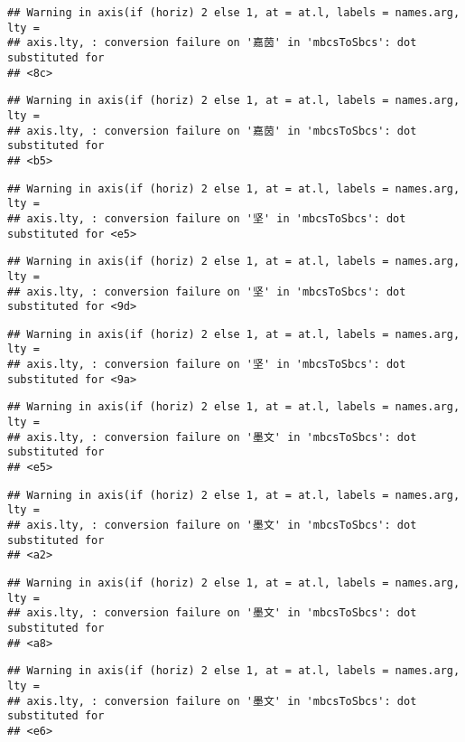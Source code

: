 \documentclass[
]{article}
\begin{document}
\begin{verbatim}
## Warning in axis(if (horiz) 2 else 1, at = at.l, labels = names.arg, lty =
## axis.lty, : conversion failure on '嘉茵' in 'mbcsToSbcs': dot substituted for
## <8c>
\end{verbatim}

\begin{verbatim}
## Warning in axis(if (horiz) 2 else 1, at = at.l, labels = names.arg, lty =
## axis.lty, : conversion failure on '嘉茵' in 'mbcsToSbcs': dot substituted for
## <b5>
\end{verbatim}

\begin{verbatim}
## Warning in axis(if (horiz) 2 else 1, at = at.l, labels = names.arg, lty =
## axis.lty, : conversion failure on '坚' in 'mbcsToSbcs': dot substituted for <e5>
\end{verbatim}

\begin{verbatim}
## Warning in axis(if (horiz) 2 else 1, at = at.l, labels = names.arg, lty =
## axis.lty, : conversion failure on '坚' in 'mbcsToSbcs': dot substituted for <9d>
\end{verbatim}

\begin{verbatim}
## Warning in axis(if (horiz) 2 else 1, at = at.l, labels = names.arg, lty =
## axis.lty, : conversion failure on '坚' in 'mbcsToSbcs': dot substituted for <9a>
\end{verbatim}

\begin{verbatim}
## Warning in axis(if (horiz) 2 else 1, at = at.l, labels = names.arg, lty =
## axis.lty, : conversion failure on '墨文' in 'mbcsToSbcs': dot substituted for
## <e5>
\end{verbatim}

\begin{verbatim}
## Warning in axis(if (horiz) 2 else 1, at = at.l, labels = names.arg, lty =
## axis.lty, : conversion failure on '墨文' in 'mbcsToSbcs': dot substituted for
## <a2>
\end{verbatim}

\begin{verbatim}
## Warning in axis(if (horiz) 2 else 1, at = at.l, labels = names.arg, lty =
## axis.lty, : conversion failure on '墨文' in 'mbcsToSbcs': dot substituted for
## <a8>
\end{verbatim}

\begin{verbatim}
## Warning in axis(if (horiz) 2 else 1, at = at.l, labels = names.arg, lty =
## axis.lty, : conversion failure on '墨文' in 'mbcsToSbcs': dot substituted for
## <e6>
\end{verbatim}
\end{document}

